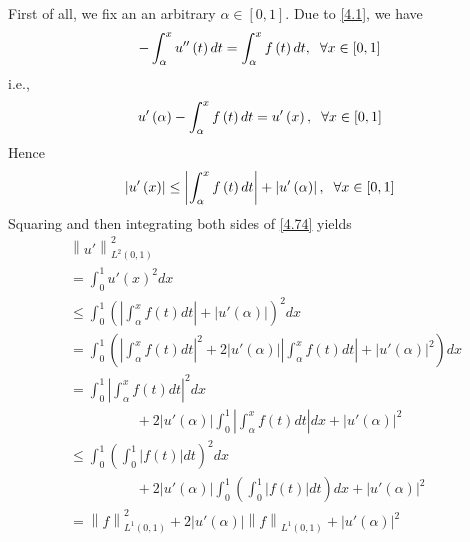 \documentclass[a4paper]{article}
\numberwithin{equation}{section}
\begin{document}
\begin{enumerate}
First of all, we fix an an arbitrary $\alpha \in \left[0,1\right]$. Due to \eqref{4.1}, we have
\begin{align}
 - \int_\alpha ^x {u''\left( t \right)dt}  = \int_\alpha ^x {f\left( t \right)dt} ,\hspace{0.2cm}\forall x \in \left[ {0,1} \right]
\end{align}
i.e.,
\begin{align}
u'\left( \alpha  \right) - \int_\alpha ^x {f\left( t \right)dt}  = u'\left( x \right),\hspace{0.2cm}\forall x \in \left[ {0,1} \right]
\end{align}
Hence
\begin{align}
\label{4.74}
\left| {u'\left( x \right)} \right| \le \left| {\int_\alpha ^x {f\left( t \right)dt} } \right| + \left| {u'\left( \alpha  \right)} \right|,\hspace{0.2cm}\forall x \in \left[ {0,1} \right]
\end{align}
Squaring and then integrating both sides of \eqref{4.74} yields
\begin{align}
&\left\| {u'} \right\|_{{L^2}\left( {0,1} \right)}^2 \\
&= \int_0^1 {u'{{\left( x \right)}^2}dx} \\
& \le \int_0^1 {{{\left( {\left| {\int_\alpha ^x {f\left( t \right)dt} } \right| + \left| {u'\left( \alpha  \right)} \right|} \right)}^2}dx} \\
& = \int_0^1 {\left( {{{\left| {\int_\alpha ^x {f\left( t \right)dt} } \right|}^2} + 2\left| {u'\left( \alpha  \right)} \right|\left| {\int_\alpha ^x {f\left( t \right)dt} } \right| + {{\left| {u'\left( \alpha  \right)} \right|}^2}} \right)dx}\\
& = \int_0^1 {{{\left| {\int_\alpha ^x {f\left( t \right)dt} } \right|}^2}dx}  \\
&\hspace{2cm}+ 2\left| {u'\left( \alpha  \right)} \right|\int_0^1 {\left| {\int_\alpha ^x {f\left( t \right)dt} } \right|dx}  + {\left| {u'\left( \alpha  \right)} \right|^2}\\
& \le \int_0^1 {{{\left( {\int_0^1 {\left| {f\left( t \right)} \right|dt} } \right)}^2}dx}  \\
&\hspace{2cm}+ 2\left| {u'\left( \alpha  \right)} \right|\int_0^1 {\left( {\int_0^1 {\left| {f\left( t \right)} \right|dt} } \right)dx}  + {\left| {u'\left( \alpha  \right)} \right|^2}\\
& = \left\| f \right\|_{{L^1}\left( {0,1} \right)}^2 + 2\left| {u'\left( \alpha  \right)} \right|{\left\| f \right\|_{{L^1}\left( {0,1} \right)}} + {\left| {u'\left( \alpha  \right)} \right|^2}\\

\end{align}
\end{enumerate}
\end{document}
